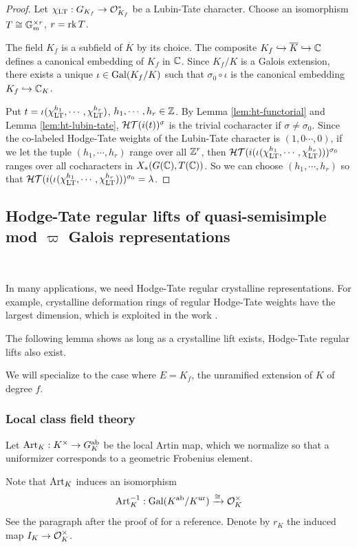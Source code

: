 \documentclass[10pt,a4paper,twoside]{article}
\begin{document}
\begin{proof}
Let $\chi_{\operatorname{LT}}: G_{K_f}\to \mathcal{O}_{K_f}^*$ be a Lubin-Tate character.
Choose an isomorphism $T \cong \mathbb{G}_m^{\times r}$, $r=\operatorname{rk} T$.

The field $K_f$ is a subfield of $\overline{K}$ by its choice.
The composite $K_f \hookrightarrow \overline{K} \hookrightarrow {\mathbb{C}}$
defines a canonical embedding of $K_f$ in ${\mathbb{C}}$.
Since $K_f/K$ is a Galois extension, there exists a unique $\iota \in \operatorname{Gal}(K_f/K)$
such that $\sigma_0\circ \iota$ is the canonical embedding $K_f \hookrightarrow {\mathbb{C}}_K$.

Put $t = \iota(\chi_{\operatorname{LT}}^{h_1}, \cdots, \chi_{\operatorname{LT}}^{h_r})$, $h_1,\cdots,h_r\in {\mathbb{Z}}$.
By Lemma \ref{lem:ht-functorial} and Lemma \ref{lem:ht-lubin-tate},
${\mathcal{HT}}(i(t))^{\sigma}$ is the trivial cocharacter if $\sigma \ne \sigma_0$.
Since the co-labeled Hodge-Tate weights of the Lubin-Tate character is $(1,0\cdots,0)$,
if we let the tuple $(h_1,\cdots,h_r)$ range over all ${\mathbb{Z}}^{r}$,
then ${\mathcal{HT}}(i(\iota(\chi_{\operatorname{LT}}^{h_1}, \cdots, \chi_{\operatorname{LT}}^{h_r})))^{\sigma_0}$ ranges over all cocharacters in $X_*(G({\mathbb{C}}), T({\mathbb{C}}))$.
So we can choose $(h_1,\cdots,h_r)$ so that ${\mathcal{HT}}(i(\iota(\chi_{\operatorname{LT}}^{h_1}, \cdots, \chi_{\operatorname{LT}}^{h_r})))^{\sigma_0}=\lambda$.
\end{proof}


\subsection{Hodge-Tate regular lifts of quasi-semisimple mod $\varpi$ Galois representations}~


In many applications, we need Hodge-Tate regular crystalline representations.
For example, crystalline deformation rings of regular Hodge-Tate weights
have the largest dimension, which is exploited in the work \cite{EG19}.

The following lemma shows as long as a crystalline lift exists,
Hodge-Tate regular lifts also exist.

We will specialize to the case where $E = K_f$, the unramified extension of $K$ of degree $f$.

\subsubsection{Local class field theory}
Let $\operatorname{Art}_K: K^{\times} \to G_K^{\operatorname{ab}}$ be the local Artin map, which we normalize so that a uniformizer corresponds to a geometric Frobenius element.

Note that $\operatorname{Art}_K$ induces an isomorphism 
$$\operatorname{Art}_K^{-1}:\operatorname{Gal}(K^{\operatorname{ab}}/K^{\operatorname{ur}}) \xrightarrow{\cong} \mathcal{O}_K^{\times}$$
See the paragraph after the proof of 
\cite[6.2]{Iw86} for a reference.
Denote by $r_K$ the induced map $I_K \to \mathcal{O}_K^{\times}$.
\end{document}
